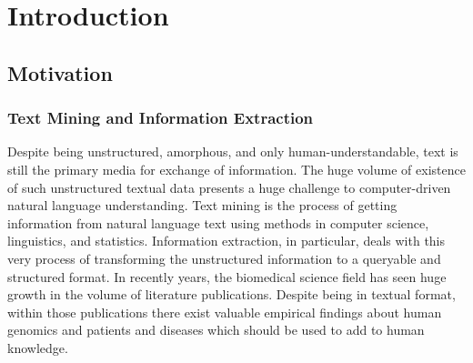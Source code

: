 \chapter{Introduction}  %

\ifpdf
    \graphicspath{{Introduction/Figs/Raster/}{Introduction/Figs/PDF/}{Introduction/Figs/}}
\else
    \graphicspath{{Introduction/Figs/Vector/}{Introduction/Figs/}}
\fi


\section{Motivation}\label{section1.1} %
\subsection{Text Mining and Information Extraction}
Despite being unstructured, amorphous, and only human-understandable, text is still the primary media for exchange of information\cite{witten2005text}. The huge volume of existence of such unstructured textual data presents a huge challenge to computer-driven natural language understanding. Text mining is the process of getting information from natural language text using methods in computer science, linguistics, and statistics. Information extraction, in particular, deals with this very process of transforming the unstructured information to a queryable and structured format. In recently years, the biomedical science field has seen huge growth in the volume of literature publications. Despite being in textual format, within those publications there exist valuable empirical findings about human genomics and patients and diseases which should be used to add to human knowledge. \newline

